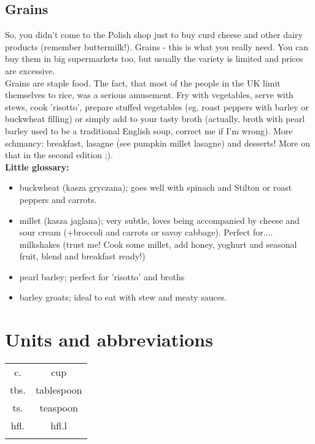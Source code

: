 \documentclass[%
twoside,
11pt
]{article}
\begin{document}
\subsection*{Grains}
So, you didn't come to the Polish shop just to buy curd cheese and other dairy products (remember buttermilk!). Grains - this is what you really need. You can buy them in big supermarkets too, but usually the variety is limited and prices are excessive.\\
Grains are staple food. The fact, that most of the people in the UK limit themselves to rice, was a serious amusement. Fry with vegetables, serve with stews, cook 'risotto', prepare stuffed vegetables (eg. roast peppers with barley or buckwheat filling) or simply add to your tasty broth (actually, broth with pearl barley used to be a traditional English soup, correct me if I'm wrong). More schmancy: breakfast, lasagne (see pumpkin millet lasagne) and desserts! More on that in the second edition ;).\\
\textbf{Little glossary:}

\begin{itemize}
    \setlength\itemsep{0.1mm}
    \item buckwheat (kasza gryczana); goes well with spinach and Stilton or roast peppers and carrots. 
    \item millet (kasza jaglana); very subtle, loves being accompanied by cheese and sour cream (+broccoli and carrots or savoy cabbage). Perfect for.... milkshakes (trust me! Cook some millet, add honey, yoghurt and seasonal fruit, blend and breakfast ready!) 
    \item pearl barley; perfect for 'risotto' and broths
    \item barley groats; ideal to eat with stew and meaty sauces. 
\end{itemize}

\section*{Units and abbreviations}
\begin{table}[h]
\centering
\begin{tabular}{cc}
    c.	& cup                     \\
    tbs. & tablespoon                     \\
    ts.	& teaspoon                    \\
    hfl. & hfl.l \\
    \multicolumn{1}{l}{} & \multicolumn{1}{l}{}
\end{tabular}
\end{table}
\newpage
\end{document}
